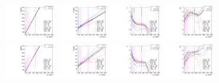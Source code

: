 \begin{figure}[htbp]
  \includegraphics[width=0.2\textwidth]{fig/analysis/paramSignalShape_allSig_MVV_HP_nobb_DEtaHi_MEAN.pdf}
  \includegraphics[width=0.2\textwidth]{fig/analysis/paramSignalShape_allSig_MVV_HP_nobb_DEtaHi_SIGMA.pdf}
  \includegraphics[width=0.2\textwidth]{fig/analysis/paramSignalShape_allSig_MVV_HP_nobb_DEtaHi_ALPHA1.pdf}
  \includegraphics[width=0.2\textwidth]{fig/analysis/paramSignalShape_allSig_MVV_HP_nobb_DEtaHi_ALPHA2.pdf}\\
  \includegraphics[width=0.2\textwidth]{fig/analysis/paramSignalShape_allSig_MVV_LP_nobb_DEtaHi_MEAN.pdf}
  \includegraphics[width=0.2\textwidth]{fig/analysis/paramSignalShape_allSig_MVV_LP_nobb_DEtaHi_SIGMA.pdf}
  \includegraphics[width=0.2\textwidth]{fig/analysis/paramSignalShape_allSig_MVV_LP_nobb_DEtaHi_ALPHA1.pdf}
  \includegraphics[width=0.2\textwidth]{fig/analysis/paramSignalShape_allSig_MVV_LP_nobb_DEtaHi_ALPHA2.pdf}\\

\end{figure}
